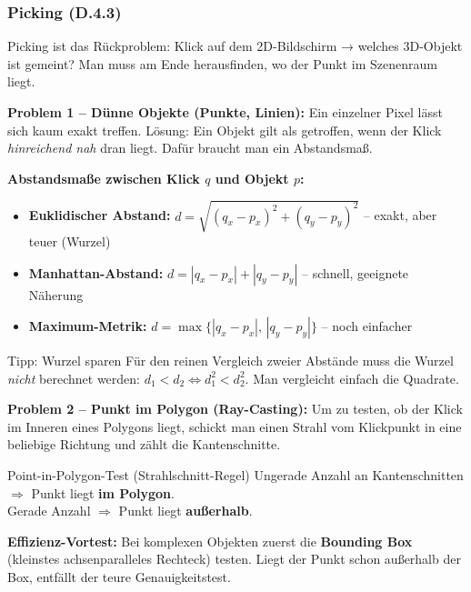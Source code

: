\documentclass[12pt, a4paper]{article}
\begin{document}
\subsubsection*{Picking (D.4.3)}

Picking ist das Rückproblem: Klick auf dem 2D-Bildschirm → welches 3D-Objekt ist gemeint? Man muss am Ende herausfinden, wo der Punkt im Szenenraum liegt.

\textbf{Problem 1 -- Dünne Objekte (Punkte, Linien):} Ein einzelner Pixel lässt sich kaum exakt treffen. Lösung: Ein Objekt gilt als getroffen, wenn der Klick \textit{hinreichend nah} dran liegt. Dafür braucht man ein Abstandsmaß.

\textbf{Abstandsmaße zwischen Klick $q$ und Objekt $p$:}
\begin{itemize}
  \item \textbf{Euklidischer Abstand:} $d = \sqrt{(q_x-p_x)^2 + (q_y-p_y)^2}$ -- exakt, aber teuer (Wurzel)
  \item \textbf{Manhattan-Abstand:} $d = |q_x-p_x| + |q_y-p_y|$ -- schnell, geeignete Näherung
  \item \textbf{Maximum-Metrik:} $d = \max\{|q_x-p_x|,\, |q_y-p_y|\}$ -- noch einfacher
\end{itemize}

\begin{notebox}{Tipp: Wurzel sparen}
Für den reinen Vergleich zweier Abstände muss die Wurzel \textit{nicht} berechnet werden: $d_1 < d_2 \iff d_1^2 < d_2^2$. Man vergleicht einfach die Quadrate.
\end{notebox}

\textbf{Problem 2 -- Punkt im Polygon (Ray-Casting):} Um zu testen, ob der Klick im Inneren eines Polygons liegt, schickt man einen Strahl vom Klickpunkt in eine beliebige Richtung und zählt die Kantenschnitte.

\begin{definitionbox}{Point-in-Polygon-Test (Strahlschnitt-Regel)}
Ungerade Anzahl an Kantenschnitten $\Rightarrow$ Punkt liegt \textbf{im Polygon}.\\
Gerade Anzahl $\Rightarrow$ Punkt liegt \textbf{außerhalb}.
\end{definitionbox}

\textbf{Effizienz-Vortest:} Bei komplexen Objekten zuerst die \textbf{Bounding Box} (kleinstes achsenparalleles Rechteck) testen. Liegt der Punkt schon außerhalb der Box, entfällt der teure Genauigkeitstest.

\end{document}
